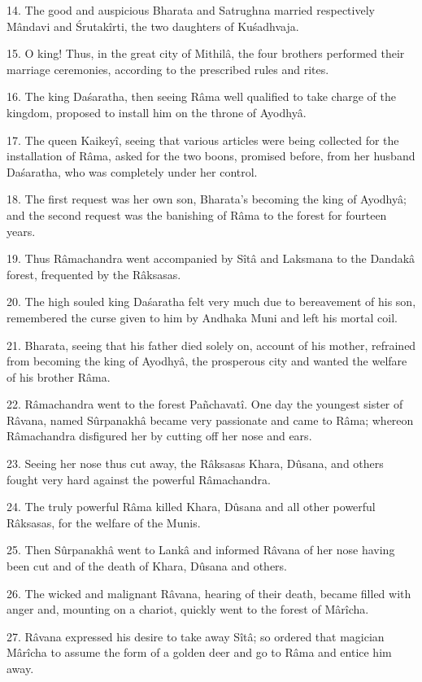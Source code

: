 14. The good and auspicious Bharata and Satrughna married respectively M\^andavi and \'Srutak\^irti, the two daughters of Ku\'sadhvaja.

15. O king! Thus, in the great city of Mithil\^a, the four brothers performed their marriage ceremonies, according to the prescribed rules and rites.

16. The king Da\'saratha, then seeing R\^ama well qualified to take charge of the kingdom, proposed to install him on the throne of Ayodhy\^a.

17. The queen Kaikey\^i, seeing that various articles were being collected for the installation of R\^ama, asked for the two boons, promised before, from her husband Da\'saratha, who was completely under her control.

18. The first request was her own son, Bharata's becoming the king of Ayodhy\^a; and the second request was the banishing of R\^ama to the forest for fourteen years.

19. Thus R\^amachandra went accompanied by S\^it\^a and Laksmana to the Dandak\^a forest, frequented by the R\^aksasas.

20. The high souled king Da\'saratha felt very much due to bereavement of his son, remembered the curse given to him by Andhaka Muni and left his mortal coil.

21. Bharata, seeing that his father died solely on, account of his mother, refrained from becoming the king of Ayodhy\^a, the prosperous city and wanted the welfare of his brother R\^ama.

22. R\^amachandra went to the forest Pa\~nchavat\^i. One day the youngest sister of R\^avana, named Sûrpanakh\^a became very passionate and came to R\^ama; whereon R\^amachandra disfigured her by cutting off her nose and ears.

23. Seeing her nose thus cut away, the R\^aksasas Khara, Dûsana, and others fought very hard against the powerful R\^amachandra.

24. The truly powerful R\^ama killed Khara, Dûsana and all other powerful R\^aksasas, for the welfare of the Munis.

25. Then Sûrpanakh\^a went to Lank\^a and informed R\^avana of her nose having been cut and of the death of Khara, Dûsana and others.

26. The wicked and malignant R\^avana, hearing of their death, became filled with anger and, mounting on a chariot, quickly went to the forest of M\^ar\^icha.

27. R\^avana expressed his desire to take away S\^it\^a; so ordered that magician M\^ar\^icha to assume the form of a golden deer and go to R\^ama and entice him away.

